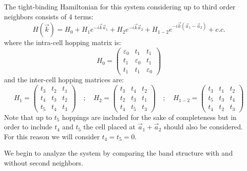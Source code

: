 The tight-binding Hamiltonian for this system considering up to third order neighbors consists of 4 terms:
\begin{equation}
  H(\vec{k}) = H_0 + H_1e^{-i\vec{k}\vec{a}_1} + H_2e^{-i\vec{k}\vec{a}_2} +
  H_{1-2}e^{-i\vec{k}(\vec{a}_1-\vec{a}_2)} + c.c.
\end{equation}
where the intra-cell hopping matrix is:
\begin{equation}
  H_0 = \left(\begin{array}{ccc}
  \varepsilon_0 & t_1 & t_1 \\
  t_1 & \varepsilon_0 & t_1 \\
  t_1 & t_1 & \varepsilon_0
  \end{array}\right)
\end{equation}
and the inter-cell hopping matrices are:
\begin{equation}
  H_1 = \left(\begin{array}{ccc}
    t_3 & t_2 & t_1 \\
    t_4 & t_3 & t_2 \\
    t_5 & t_4 & t_3
  \end{array}\right)\quad ; \quad
  H_2 = \left(\begin{array}{ccc}
    t_3 & t_4 & t_2 \\
    t_2 & t_3 & t_1 \\
    t_4 & t_5 & t_3
  \end{array}\right)\quad ; \quad
  H_{1-2} = \left(\begin{array}{ccc}
    t_3 & t_1 & t_2 \\
    t_5 & t_3 & t_4 \\
    t_4 & t_2 & t_3
  \end{array}\right)
\end{equation}
Note that up to $t_5$ hoppings are included for the sake of completeness but in order to include $t_4$ and $t_5$ the cell placed at $\vec{a}_1 + \vec{a}_2$ should also be considered. For this reason we will consider $t_4 = t_5 = 0$.

We begin to analyze the system by comparing the band structure with and without second neighbors.
